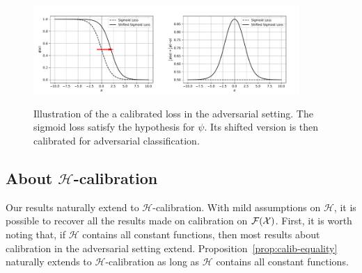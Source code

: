     
    



\begin{figure}
    \centering
    \includegraphics[width = 0.45\textwidth]{sections/3_calibration/images/calibrated_loss.pdf}\includegraphics[width = 0.45\textwidth]{sections/3_calibration/images/calibrated_loss_ass.pdf}
    \caption{Illustration of the a calibrated loss in the adversarial setting. The sigmoid loss satisfy the hypothesis for $\psi$. Its shifted version is then calibrated for adversarial classification.}
    \label{fig:cal}
\end{figure}






\subsection{About $\mathcal{H}$-calibration}
\label{sec:hcal}
Our results naturally extend to $\mathcal{H}$-calibration. With mild assumptions on $\mathcal{H}$, it is possible to recover all the results made on calibration on $\mathcal{F}(\mathcal{X})$. First, it is worth noting that, if $\mathcal{H}$ contains all constant functions, then most results about calibration in the adversarial setting extend. Proposition~\ref{prop:calib-equality}  naturally extends to $\mathcal{H}$-calibration as long as $\mathcal{H}$ contains all constant functions. 


